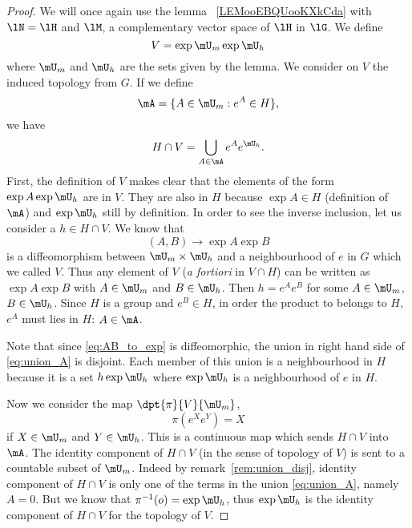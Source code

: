 \begin{proof}
	We will once again use the lemma ~\ref{LEMooEBQUooKXkCda} with $\lN=\lH$ and $\lM$, a complementary vector space of $\lH$ in $\lG$. We define
	\[
		V=\exp\mU_m\exp\mU_h
	\]
	where $\mU_m$ and $\mU_h$ are the sets given by the lemma. We consider on $V$ the induced topology from $G$. If we define
	\[
		\mA=\{A\in\mU_m:e^{A}\in H\},
	\]
	we have
	\begin{equation}\label{eq:union_A}
		H\cap V=\bigcup_{A\in\mA}e^{A}e^{\mU_h}.
	\end{equation}
	First, the definition of $V$ makes clear that the elements of the form $\exp A\exp\mU_h$ are in $V$. They are also in $H$ because $\exp A\in H$ (definition of $\mA$) and $\exp\mU_h$ still by definition. In order to see the inverse inclusion, let us consider a $h\in H\cap V$. We know that
	\begin{equation}\label{eq:AB_to_exp}
		(A,B)\to\exp A\exp B
	\end{equation}
	is a diffeomorphism between $\mU_m\times\mU_h$ and a neighbourhood of $e$ in $G$ which we called $V$. Thus any element of $V$ (\emph{a fortiori} in $V\cap H$) can be written as $\exp A\exp B$ with $A\in\mU_m$ and $B\in\mU_h$. Then $h=e^Ae^B$ for some $A\in\mU_m$, $B\in\mU_h$. Since $H$ is a group and $e^B\in H$, in order the product to belongs to $H$, $e^A$ must lies in $H$: $A\in\mA$.

	\begin{remark}\label{rem:union_disj}
		Note that since \eqref{eq:AB_to_exp} is diffeomorphic, the union in right hand side of \eqref{eq:union_A} is disjoint. Each member of this union is a neighbourhood in $H$ because it is a set $h\exp\mU_h$ where $\exp\mU_h$ is a neighbourhood of $e$ in $H$.
	\end{remark}

	Now we consider the map $\dpt{\pi}{V}{\mU_m}$,
	\[
		\pi(e^{X}e^Y)=X
	\]
	if $X\in\mU_m$ and $Y\in\mU_h$. This is a continuous map which sends $H\cap V$ into $\mA$. The identity component of $H\cap V$ (in the sense of topology of $V$) is sent to a countable subset of $\mU_m$. Indeed by remark~\ref{rem:union_disj}, identity component of $H\cap V$ is only one of the terms in the union \eqref{eq:union_A}, namely $A=0$. But we know that $\pi^{-1}(o)=\exp\mU_h$, thus $\exp\mU_h$ is the identity component of $H\cap V$ for the topology of $V$.
\end{proof}


